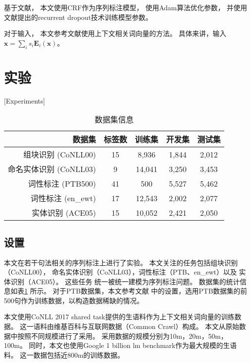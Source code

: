 基于文献，
本文使用CRF\cite{Lafferty:2001:CRF:645530.655813}作为序列标注模型，
使用Adam算法\cite{DBLP:journals/corr/KingmaB14}优化参数，
并使用文献提出的recurrent dropout技术训练模型参数。

对于输入，
本文参考文献使用上下文相关词向量的方法。
具体来讲，输入$\mathbf{x} = \sum_i s_i \mathbf{E}_i (\mathbf{x})$。

\section{实验}[Experiments]
\begin{table}[t]
		\centering
	\begin{tabular}{r cccc}
		\hline
		数据集 & 标签数 & 训练集 & 开发集 & 测试集 \\
		\hline
		组块识别 (CoNLL00) & 15 & 8,936 & 1,844 & 2,012 \\
		命名实体识别 (CoNLL03) & 9 & 14,041 & 3,250 & 3,453 \\
		词性标注 (PTB500) & 41 & 500 & 5,527 & 5,462 \\
		词性标注 (en\_ewt) & 17 & 12,543 & 2,002 & 2,077 \\
		实体识别 (ACE05) & 15 & 10,052 & 2,421 & 2,050 \\
		\hline
	\end{tabular}
	\caption{数据集信息}\label{tbl:elmo:stats}
\end{table}

\subsection{设置}
本文在若干句法相关的序列标注上进行了实验。
本文关注的任务包括组块识别（CoNLL00），
命名实体识别（CoNLL03），词性标注（PTB\cite{Marcus93buildinga}、en\_ewt）以及
实体识别（ACE05）。
这些任务
统一被统一建模为序列标注问题。
数据集的统计信息如表\ref{tbl:elmo:stats}
所示。
对于PTB数据集，本文参考文献
中的设置，选用PTB数据集的前500句作为训练数据，以构造数据稀缺的情况。

本文使用CoNLL 2017 shared task\cite{udst:overview2017}提供的生语料作为上下文相关词向量的训练数据。
这一语料由维基百科与互联网数据（Common Crawl）构成。
本文从原始数据中按照不同规模进行了采用。
采用数据的规模分别为10m，20m，50m，100m。
同时，本文也使用Google 1 billion lm benchmark作为最大规模的生语料。
这一数据包括近800m的训练数据。

